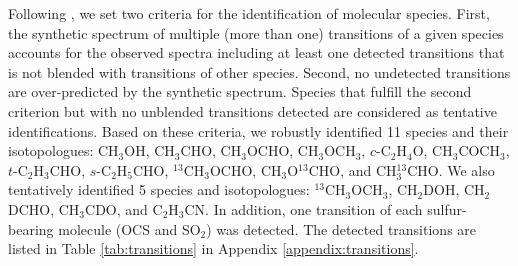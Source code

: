 \documentclass[linenumbers, twocolumn, twocolappendix, astrosymb, times]{aastex631}
\newcommand{\methanol}{CH$_3$OH\xspace}
\newcommand{\acetaldehyde}{CH$_3$CHO\xspace}
\newcommand{\methylformate}{CH$_3$OCHO\xspace}
\newcommand{\dimethylether}{CH$_3$OCH$_3$\xspace}
\newcommand{\acetone}{CH$_3$COCH$_3$\xspace}
\newcommand{\ethyleneoxide}{$c$-C$_2$H$_4$O\xspace}
\newcommand{\propenal}{$t$-C$_2$H$_3$CHO\xspace}
\newcommand{\propanal}{$s$-C$_2$H$_5$CHO\xspace}
\begin{document}
Following \citet{Jorgensen2020}, we set two criteria for the identification of molecular species. First, the synthetic spectrum of multiple (more than one) transitions of a given species accounts for the observed spectra including at least one detected transitions that is not blended with transitions of other species. Second, no undetected transitions are over-predicted by the synthetic spectrum. Species that fulfill the second criterion but with no unblended transitions detected are considered as tentative identifications. Based on these criteria, we robustly identified 11 species and their isotopologues: \methanol, \acetaldehyde, \methylformate, \dimethylether, \ethyleneoxide, \acetone, \propenal, \propanal, $^{13}$CH$_3$OCHO, CH$_3$O$^{13}$CHO, and CH$_3^{13}$CHO. We also tentatively identified 5 species and isotopologues: $^{13}$CH$_3$OCH$_3$, CH$_2$DOH, CH$_2$DCHO, CH$_3$CDO, and C$_2$H$_3$CN. In addition, one transition of each sulfur-bearing molecule (OCS and SO$_2$) was detected. The detected transitions are listed in Table \ref{tab:transitions} in Appendix \ref{appendix:transitions}.




\begin{figure*}
\caption{The 3.3 mm dust continuum image (left top) and the velocity-integrated intensity maps of the molecular line emission (others) in the V883 Ori disk. The velocity range for integration are $\pm3.5$ km s$^{-1}$ with respect to the source systemic velocity $v_\mathrm{sys}=4.25$ km s$^{-1}$ \citep{Tobin2023} including \dimethylether and \acetone, where multiple blended transitions are integrated together. The molecular species, transitions, and upper state energy levels are indicated in the upper-left corner of each panel. The black contours start from 5$\sigma$ with steps of 2.5$\sigma$, where $\sigma$ are the noise level of each map measured on the emission-free region, spanning $\sigma = 1.8$--4.4 mJy beam$^{-1}$ km s$^{-1}$ depending on the maps. The synthesized beam and a scale bar of 80 au are shown in the lower left and right corner of each panel, respectively.}
\label{fig:moment_zero_gallery}
\end{figure*}
\end{document}
